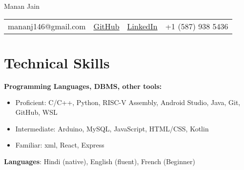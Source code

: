 \documentclass[letterpaper,10pt]{article}
\newcommand{\resumeItem}[1]{
  \item\small{
    {#1 \vspace{-2pt}}
  }
}
\newcommand{\resumeItemListStart}{\begin{itemize}}
\newcommand{\resumeItemListEnd}{\end{itemize}\vspace{-5pt}}
\begin{document}
\begin{center}
    {\Huge Manan Jain} \\ \vspace{2pt}
    
\end{center}

\begin{center}
        \setlength{\tabcolsep}{18pt}
    \begin{tabular}{c | c | c | c }
         {mananj146@gmail.com} & {\href{https://github.com/manan3172003}{GitHub}} & {\href{https://www.linkedin.com/in/manan-jain-253486224/}{LinkedIn}} & {{+1 (587) 938 5436}}
    \end{tabular}{}
\end{center}
\vspace{15pt}

\section{\LARGE Technical Skills}
 \begin{itemize}[leftmargin=0.15in, label={}]
    \small{\item{
     \textbf{Programming Languages, DBMS, other tools:}
        {\resumeItemListStart
        \resumeItem{Proficient: C/C++, Python, RISC-V Assembly, Android Studio, Java, Git, GitHub, WSL}
        \resumeItem{Intermediate: Arduino, MySQL, JavaScript, HTML/CSS, Kotlin}
        \resumeItem{Familiar: xml, React, Express}
    \resumeItemListEnd}
    \vspace{5pt}
     \textbf{Languages}{: Hindi (native), English (fluent), French (Beginner)}
     
    }}
 \end{itemize}


\vspace{-2pt}
\end{document}
